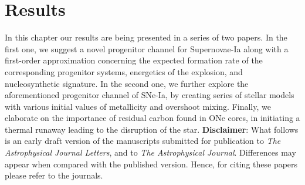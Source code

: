\documentclass[../../main/thesis_msc.tex]{subfiles}
\begin{document}
	\chapter{Results}
	
	
	In this chapter our results are being presented in a series of two papers. In the first one, we suggest a novel progenitor channel for Supernovae-Ia along with a first-order approximation concerning the expected formation rate of the corresponding progenitor systems, energetics of the explosion, and nucleosynthetic signature. In the second one, we further explore the aforementioned progenitor channel of SNe-Ia, by creating series of stellar models with various initial values of metallicity and overshoot mixing. Finally, we elaborate on the importance of residual carbon found in ONe cores, in initiating a thermal runaway leading to the disruption of the star.
	\newline
	\noindent \textbf{Disclaimer}: What follows is an early draft version of the manuscripts submitted for publication to \textit{The Astrophysical Journal Letters}, and to \textit{The Astrophysical Journal}. Differences may appear when compared with the published version. Hence, for citing these papers please refer to the journals.
	
	\newpage
	\thispagestyle{empty}
     \null\newpage
	
            
            
           
            
     \thispagestyle{empty}
     \null\newpage
     
    
\end{document}
